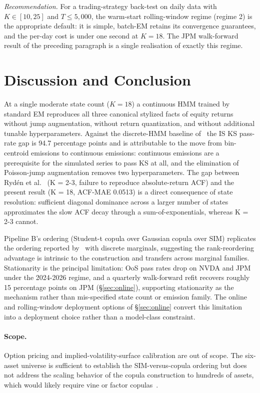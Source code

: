 \documentclass[sigconf,anonymous,nonacm=true]{acmart}
\begin{document}
\emph{Recommendation.} For a trading-strategy back-test on daily data
with $K \in [10, 25]$ and $T \leq 5{,}000$, the warm-start rolling-window
regime (regime 2) is the appropriate default: it is simple, batch-EM
retains its convergence guarantees, and the per-day cost is under one
second at $K = 18$. The JPM walk-forward result of the preceding
paragraph is a single realisation of exactly this regime.

\section{Discussion and Conclusion}
\label{sec:discussion}

At a single moderate state count ($K = 18$) a continuous HMM trained by
standard EM reproduces all three canonical stylized facts of equity
returns without jump augmentation, without return quantization, and
without additional tunable hyperparameters. Against the discrete-HMM
baseline of~\cite{alswaidan2026hybrid} the IS KS pass-rate gap is 94.7
percentage points and is attributable to the move from bin-centroid
emissions to continuous emissions: continuous emissions are a
prerequisite for the simulated series to pass KS at all, and the
elimination of Poisson-jump augmentation removes two
hyperparameters. The gap between Ryd\'{e}n et al.~\cite{ryden1998stylized}
(K = 2-3, failure to reproduce absolute-return ACF) and the present
result (K = 18, ACF-MAE 0.0513) is a direct consequence of state
resolution: sufficient diagonal dominance across a larger number of
states approximates the slow ACF decay through a sum-of-exponentials,
whereas K = 2-3 cannot.

Pipeline B's ordering (Student-t copula over Gaussian copula over SIM)
replicates the ordering reported by~\cite{alswaidan2026hybrid} with
discrete marginals, suggesting the rank-reordering advantage is
intrinsic to the construction and transfers across marginal families.
Stationarity is the principal limitation: OoS pass rates drop on NVDA
and JPM under the 2024-2026 regime, and a quarterly walk-forward refit
recovers roughly 15 percentage points on JPM (\S\ref{sec:online}),
supporting stationarity as the mechanism rather than mis-specified state
count or emission family. The online and rolling-window deployment
options of \S\ref{sec:online} convert this limitation into a deployment
choice rather than a model-class constraint.

\paragraph{Scope.} Option pricing and implied-volatility-surface
calibration are out of scope. The six-asset universe is sufficient to
establish the SIM-versus-copula ordering but does not address the
scaling behavior of the copula construction to hundreds of assets,
which would likely require vine or factor copulas~\cite{bedford2002vines}.
\end{document}
